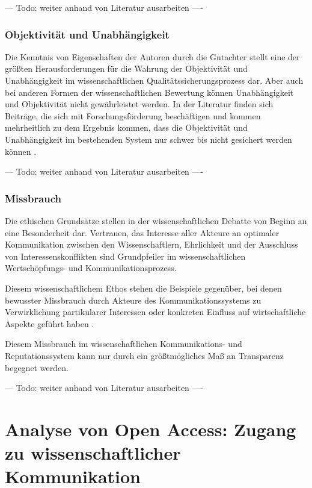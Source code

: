 --- Todo: weiter anhand von Literatur ausarbeiten ----

\subsubsection{Objektivität und Unabhängigkeit}

Die Kenntnis von Eigenschaften der Autoren durch die Gutachter stellt eine der größten Herausforderungen für die Wahrung der Objektivität und Unabhängigkeit im wissenschaftlichen Qualitätssicherungsprozess dar. Aber auch bei anderen Formen der wissenschaftlichen Bewertung können Unabhängigkeit und Objektivität nicht gewährleistet werden. In der Literatur finden sich Beiträge, die sich mit Forschungsförderung beschäftigen und kommen mehrheitlich zu dem Ergebnis kommen, dass die Objektivität und Unabhängigkeit im bestehenden System nur schwer bis nicht gesichert werden können \cite{suchen}.

--- Todo: weiter anhand von Literatur ausarbeiten ----

\subsubsection{Missbrauch}

Die ethischen Grundsätze stellen in der wissenschaftlichen Debatte von Beginn an eine Besonderheit dar. Vertrauen, das Interesse aller Akteure an optimaler Kommunikation zwischen den Wissenschaftlern, Ehrlichkeit und der Ausschluss von Interessenskonflikten sind Grundpfeiler im wissenschaftlichen Wertschöpfungs- und Kommunikationsprozess.

Diesem wissenschaftlichem Ethos stehen die Beispiele gegenüber, bei denen bewusster Missbrauch durch Akteure des Kommunikationssystems zu Verwirklichung partikularer Interessen oder konkreten Einfluss auf wirtschaftliche Aspekte geführt haben \cite{suchen}.

Diesem Missbrauch im wissenschaftlichen Kommunikations- und Reputationssystem kann nur durch ein größtmögliches Maß an Transparenz begegnet werden.

--- Todo: weiter anhand von Literatur ausarbeiten ----

\section{Analyse von Open Access: Zugang zu wissenschaftlicher Kommunikation}

